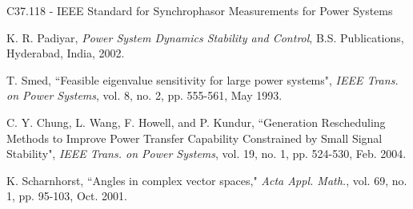 \begin{thebibliography}{25}
 C37.118 - IEEE Standard for Synchrophasor Measurements for Power Systems

K. R. Padiyar,  \textit{Power System Dynamics Stability and Control}, B.S. Publications, Hyderabad, India, 2002.

T. Smed, ``Feasible eigenvalue sensitivity for large power systems", \textit{IEEE Trans. on Power Systems}, vol. 8, no. 2,  pp. 555-561, May 1993.

C. Y. Chung, L. Wang, F. Howell, and P. Kundur, ``Generation Rescheduling Methods to Improve Power Transfer Capability Constrained by Small Signal Stability", \textit{IEEE Trans. on Power Systems}, vol. 19, no. 1,  pp. 524-530, Feb. 2004.

K. Scharnhorst, ``Angles in complex vector spaces," \textit{Acta Appl. Math.}, vol. 69, no. 1, pp. 95-103, Oct. 2001.
\end{thebibliography}